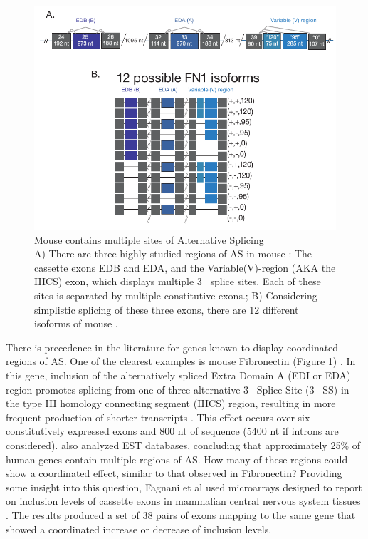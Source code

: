 \begin{figure}[htbp]
	\centering 
	\includegraphics{Figures/Chapter1/Fibronectin.pdf}
	\caption[Mouse \fn{} contains multipe sites of Alternative Splicing]
	{
		Mouse \fn{} contains multiple sites of Alternative Splicing\\[0.25cm]
		A) There are three highly-studied regions of AS in mouse \fn{}: The cassette exons EDB and EDA, and the Variable(V)-region (AKA the IIICS) exon, which displays multiple 3\textprime~ splice sites.  Each of these sites is separated by multiple constitutive exons.; B) Considering simplistic splicing of these three exons, there are 12 different isoforms of mouse \fn{}.
	}
	\label{fig:mouseFn1}
\end{figure}

There is precedence in the literature for genes known to display coordinated regions of AS. One of the clearest examples is mouse Fibronectin \fn{} (Figure \ref{fig:mouseFn1}) \citep{Schwarzbauer1983, White2011a}. In this gene, inclusion of the alternatively spliced Extra Domain A (EDI or EDA) region promotes splicing from one of three alternative 3\textprime~ Splice Site (3\textprime~ SS) in the type III homology connecting segment (IIICS) region, resulting in more frequent production of shorter transcripts \citep{Fededa2005}. This effect occurs over six constitutively expressed exons and 800 nt of sequence (5400 nt if introns are considered). \citep{Fededa2005} also analyzed EST databases, concluding that approximately 25\% of human genes contain multiple regions of AS. How many of these regions could show a coordinated effect, similar to that observed in Fibronectin? Providing some insight into this question, Fagnani et al used microarrays designed to report on inclusion levels of cassette exons in mammalian central nervous system tissues \citep{Fagnani2007}. The results produced a set of 38 pairs of exons mapping to the same gene that showed a coordinated increase or decrease of inclusion levels. 

